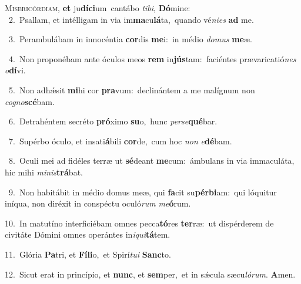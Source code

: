 \lettrine{\initial\textcolor{\initialcolor}{M}}{isericórdiam,} \textbf{et} ju\-\textbf{dí}\-\textbf{ci}um~\star cantábo \textit{ti}\-\textit{bi}, \textbf{Dó}\-mine:\\
{\numbfont\textcolor{\numbcolor}{~2.}}~Psallam, et intélligam in via im\-\textbf{ma}\-cu\-\textbf{lá}\-ta,~\star quando vé\-\textit{ni}\-\textit{es} \textbf{ad} me.\par
{\numbfont\textcolor{\numbcolor}{~3.}}~Perambulábam in innocéntia \textbf{cor}\-dis \textbf{me}\-i:~\star in médio \textit{do}\-\textit{mus} \textbf{me}\-æ.\par
{\numbfont\textcolor{\numbcolor}{~4.}}~Non proponébam ante óculos meos \textbf{rem} in\-\textbf{jús}\-tam:~\star faciéntes prævaricatió\textit{nes} \textit{o}\-\textbf{dí}vi.\par
{\numbfont\textcolor{\numbcolor}{~5.}}~Non adhǽsit \textbf{mi}\-hi cor \textbf{pra}\-vum:~\star declinántem a me malígnum non \textit{co}\-\textit{gno}\textbf{scé}bam.\par
{\numbfont\textcolor{\numbcolor}{~6.}}~Detrahéntem secréto \textbf{pró}\-ximo \textbf{su}\-o,~\star hunc \textit{per}\-\textit{se}\textbf{qué}bar.\par
{\numbfont\textcolor{\numbcolor}{~7.}}~Supérbo óculo, et insati\-\textbf{á}\-bili \textbf{cor}\-de,~\star cum hoc \textit{non} \textit{e}\-\textbf{dé}bam.\par
{\numbfont\textcolor{\numbcolor}{~8.}}~Oculi mei ad fidéles terræ ut \textbf{sé}\-deant \textbf{me}\-cum:~\star ámbulans in via immaculáta, hic mihi \textit{mi}\-\textit{nis}\textbf{trá}bat.\par
{\numbfont\textcolor{\numbcolor}{~9.}}~Non habitábit in médio domus meæ, qui \textbf{fa}\-cit su\-\textbf{pér}\-\textbf{bi}am:~\star qui lóquitur iníqua, non diréxit in conspéctu oculó\textit{rum} \textit{me}\-\textbf{ó}rum.\par
{\numbfont\textcolor{\numbcolor}{10.}}~In matutíno interficiébam omnes pecca\-\textbf{tó}\-res \textbf{ter}\-ræ:~\star ut dispérderem de civitáte Dómini omnes operántes in\-\textit{i}\-\textit{qui}\textbf{tá}tem.\par
{\numbfont\textcolor{\numbcolor}{11.}}~Glória \textbf{Pa}\-tri, et \textbf{Fí}\-\textbf{li}o,~\star et Spirí\-\textit{tu}\-\textit{i} \textbf{Sanc}\-to.\par
{\numbfont\textcolor{\numbcolor}{12.}}~Sicut erat in princípio, et \textbf{nunc}\-, et \textbf{sem}\-per,~\star et in sǽcula sæcu\-\textit{ló}\-\textit{rum}. \textbf{A}\-men.\par
